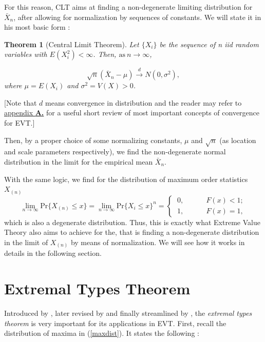 \documentclass[11pt,a4paper,openany ]{book}
\newtheorem{exe}{Theorem}
\begin{document}
For this reason, CLT aims at finding a non-degenerate limiting distribution for $\bar{X}_n$, after allowing for normalization by sequences of constants. We will state it in his most basic form :

\begin{exe}[Central Limit Theorem] 
	Let $\{X_i\}$ be the sequence of n iid random variables with $E(X^2_i)<\infty$. Then, $\text{as} \ n\rightarrow\infty$,
	
	\begin{equation*}
	\sqrt{n}(\bar{X}_n-\mu)\stackrel{d}{\longrightarrow}N(0,\sigma^2),
	\end{equation*}
	where $\mu=E(X_i)$ and $\sigma^2=V(X)>0$.
\end{exe}
[Note that $d$ means convergence in distribution and the reader may refer to \hyperref[convconc]{appendix\textbf{ A.}} for a useful short review of most important concepts of convergence for EVT.]

Then, by a proper choice of some normalizing constants, $\mu$ and $\sqrt{n}$ (as location and scale parameters respectively), we find the non-degenerate normal distribution in the limit for the empirical mean $\bar{X}_n$. 

With the same logic, we find for the distribution of maximum order statistics $X_{(n)}$ 
\begin{equation}
\displaystyle{\lim_{n \to \infty}}\text{Pr}\big\{X_{(n)}\leq x\big\}=\displaystyle{\lim_{n \to \infty}}\text{Pr}\big\{X_i\leq x\big\}^n=\begin{cases}
\ 0, \ \ \ \ \ \ \ \ \ \ \  \ \ \ F(x)<1; \\ 
\ 1, \ \ \ \ \ \ \ \ \ \ \ \  \ \ F(x)=1,
\end{cases}
\end{equation}
which is also a degenerate distribution.
Thus, this is exactly what Extreme Value Theory also aims to achieve for the, that is finding a non-degenerate distribution in the limit of $X_{(n)}$ by means of normalization. We will see how it works in details in the following section.


\section{Extremal Types Theorem}\label{sec:extrtypethm}


Introduced by \cite{fisher_limiting_1928}, later revised by \cite{gnedenko_sur_1943} and finally streamlined by \cite{haan_regular_1970}, the \emph{extremal types theorem} is very important for its applications in EVT. First, recall the distribution of maxima in (\ref{maxdist}). It states the following :  
\end{document}
